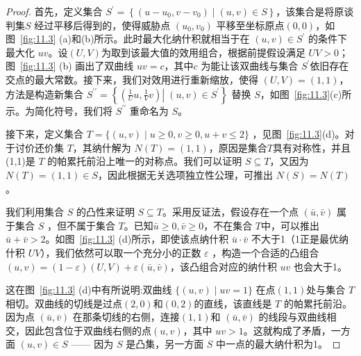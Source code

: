 \begin{proof}
首先，定义集合 \({S}^{\prime } = \left\{  {\left( {u - {u}_{0},v - {v}_{0}}\right)  \mid  \left( {u,v}\right)  \in  S}\right\}\)，该集合是将原谈判集\(S\) 经过平移后得到的，使得威胁点 \(\left( {{u}_{0},{v}_{0}}\right)\) 平移至坐标原点$(0,0)$，如图~\ref{fig:11.3} (a)和(b)所示。此时最大化纳什积就相当于在 \(\left( {u,v}\right)  \in  {S}^{\prime }\) 的条件下最大化 \({uv}\)。设$(U,V)$为取到该最大值的效用组合，根据前提假设满足 \({UV} > 0\)；图~\ref{fig:11.3} (b) 画出了双曲线 \({uv} = c\)，其中\(c\) 为能让该双曲线与集合 \({S}^{\prime }\)依旧存在交点的最大常数。接下来，我们对效用进行重新缩放，使得 \(\left( {U,V}\right)  = \left( {1,1}\right)\)，方法是构造新集合 \({S}^{\prime \prime } = \left\{  {\left. \left( {\frac{1}{U}u,\frac{1}{V}v}\right) \right| \;\left( {u,v}\right)  \in  {S}^{\prime }}\right\}\) 替换 \(S\)，如图~\ref{fig:11.3}(c)所示。为简化符号，我们将 \({S}^{\prime \prime }\) 重命名为 \(S\)。

接下来，定义集合 \(T = \{ \left( {u,v}\right)  \mid  u \geq  0,v \geq  0,u + v \leq  2\}\) ，见图~\ref{fig:11.3}(d)。对于讨价还价集 \(T\)，其纳什解为 \(N\left( T\right)  = \left( {1,1}\right)\)，原因是集合\(T\)具有对称性，并且(1,1)是 \(T\) 的帕累托前沿上唯一的对称点。我们可以证明 \(S \subseteq  T\)，又因为 \(N\left( T\right)  = \left( {1,1}\right)  \in  S\)，因此根据无关选项独立性公理，可推出 \(N\left( S\right)  = N\left( T\right)\)。

我们利用集合 \(S\) 的凸性来证明 \(S \subseteq  T\)。采用反证法，假设存在一个点 \(\left( {\bar{u},\bar{v}}\right)\) 属于集合 \(S\) ，但不属于集合 \(T\)。已知\(\bar{u} \geq  0,\bar{v} \geq  0\)，不在集合 \(T\)中，可以推出\(\bar{u} + \bar{v} > 2\)。如图~\ref{fig:11.3} (d)所示，即使该点纳什积 \(\bar{u} \cdot  \bar{v}\) 不大于1（1正是最优纳什积 \({UV}\)），我们依然可以取一个充分小的正数 \(\varepsilon\) ，构造一个合适的凸组合 \(\left( {u,v}\right)  = \left( {1 - \varepsilon }\right) \left( {U,V}\right)  + \varepsilon \left( {\bar{u},\bar{v}}\right)\)，该凸组合对应的纳什积 \({uv}\) 也会大于1。

这在图~\ref{fig:11.3} (d)中有所说明:双曲线 \(\{ \left( {u,v}\right)  \mid  {uv} = 1\}\) 在点$(1,1)$处与集合 \(T\) 相切。双曲线的切线是过点$(2,0)$和$(0,2)$的直线，该直线是 \(T\) 的帕累托前沿。因为点 \(\left( {\bar{u},\bar{v}}\right)\) 在那条切线的右侧，连接$(1,1)$和 \(\left( {\bar{u},\bar{v}}\right)\) 的线段与双曲线相交，因此包含位于双曲线右侧的点$(u,v)$，其中 \({uv} > 1\)。这就构成了矛盾，一方面 \(\left( {u,v}\right)  \in  S\) —— 因为 \(S\) 是凸集，另一方面 \(S\) 中一点的最大纳什积为1。


\end{proof}
